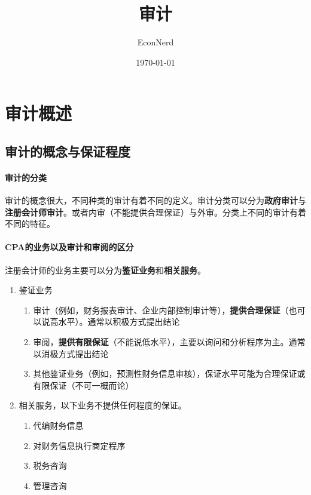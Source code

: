 \documentclass[UTF8,12pt]{ctexart}
\title{审计} %
\author{EconNerd}
\date{\today}
\numberwithin{equation}{section} %
\numberwithin{figure}{section}
\numberwithin{table}{section}
\begin{document}
	\maketitle
	\tableofcontents
	\newpage

	\section{审计概述}
	\subsection{审计的概念与保证程度}
	\paragraph{审计的分类}审计的概念很大，不同种类的审计有着不同的定义。审计分类可以分为\textbf{政府审计}与\textbf{注册会计师审计}。或者内审（不能提供合理保证）与外审。分类上不同的审计有着不同的特征。
	
	\paragraph{CPA的业务以及审计和审阅的区分}注册会计师的业务主要可以分为\textbf{鉴证业务}和\textbf{相关服务}。
	\begin{enumerate}
		\item 鉴证业务
		\begin{enumerate}
			\item 审计（例如，财务报表审计、企业内部控制审计等），\textbf{提供合理保证}（也可以说高水平）。通常以积极方式提出结论
			
			\item 审阅，\textbf{提供有限保证}（不能说低水平），主要以询问和分析程序为主。通常以消极方式提出结论
			
			\item 其他鉴证业务（例如，预测性财务信息审核），保证水平可能为合理保证或有限保证（不可一概而论）
		\end{enumerate}
		
		\item 相关服务，以下业务不提供任何程度的保证。
		\begin{enumerate}
			\item 代编财务信息
			
			\item 对财务信息执行商定程序
			
			\item 税务咨询
			
			\item 管理咨询
		\end{enumerate}
	\end{enumerate}
	
\end{document}
